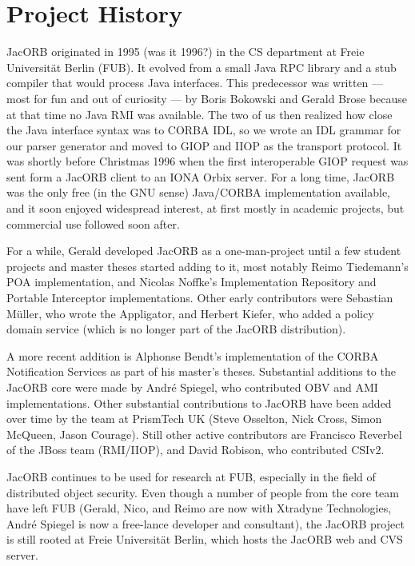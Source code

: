 \section{Project History}

JacORB originated in 1995 (was it 1996?) in the CS department at Freie
Universit{\"a}t Berlin (FUB). It evolved from a small Java RPC library and a
stub compiler that would process Java interfaces. This predecessor was
written --- most for fun and out of curiosity --- by Boris Bokowski
and Gerald Brose because at that time no Java RMI was available. The
two of us then realized how close the Java interface syntax was to
CORBA IDL, so we wrote an IDL grammar for our parser generator and
moved to GIOP and IIOP as the transport protocol. It was shortly
before Christmas 1996 when the first interoperable GIOP request was
sent form a JacORB client to an IONA Orbix server. For a long time,
JacORB was the only free (in the GNU sense) Java/CORBA implementation
available, and it soon enjoyed widespread interest, at first mostly in
academic projects, but commercial use followed soon after.

For a while, Gerald developed JacORB as a one-man-project until a few
student projects and master theses started adding to it, most notably
Reimo Tiedemann's POA implementation, and Nicolas Noffke's
Implementation Repository and Portable Interceptor implementations.
Other early contributors were Sebastian M{\"u}ller, who wrote the
Appligator, and Herbert Kiefer, who added a policy domain service
(which is no longer part of the JacORB distribution). 

A more recent addition is Alphonse Bendt's implementation of the CORBA
Notification Services as part of his master's theses. Substantial
additions to the JacORB core were made by Andr{\'e} Spiegel, who
contributed OBV and AMI implementations. Other substantial
contributions to JacORB have been added over time by the team at
PrismTech UK (Steve Osselton, Nick Cross, Simon McQueen, Jason
Courage). Still other active contributors are Francisco Reverbel of
the JBoss team (RMI/IIOP), and David Robison, who contributed CSIv2.

JacORB continues to be used for research at FUB, especially in the
field of distributed object security. Even though a number of people
from the core team have left FUB (Gerald, Nico, and Reimo are now with
Xtradyne Technologies, Andr{\'e} Spiegel is now a free-lance developer and
consultant), the JacORB project is still rooted at Freie
Universit{\"a}t Berlin, which hosts the JacORB web and CVS server.

